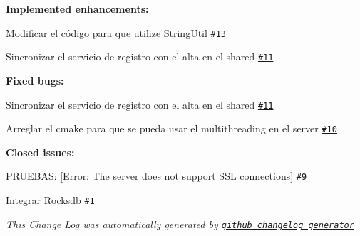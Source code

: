 {\bfseries Implemented enhancements\+:}


\begin{DoxyItemize}
\item Modificar el código para que utilize String\+Util \href{https://github.com/seguijoaquin/taller2-appserver/issues/13}{\tt \#13}
\item Sincronizar el servicio de registro con el alta en el shared \href{https://github.com/seguijoaquin/taller2-appserver/issues/11}{\tt \#11}
\end{DoxyItemize}

{\bfseries Fixed bugs\+:}


\begin{DoxyItemize}
\item Sincronizar el servicio de registro con el alta en el shared \href{https://github.com/seguijoaquin/taller2-appserver/issues/11}{\tt \#11}
\item Arreglar el cmake para que se pueda usar el multithreading en el server \href{https://github.com/seguijoaquin/taller2-appserver/issues/10}{\tt \#10}
\end{DoxyItemize}

{\bfseries Closed issues\+:}


\begin{DoxyItemize}
\item P\+R\+U\+E\+B\+AS\+: \mbox{[}Error\+: The server does not support S\+SL connections\mbox{]} \href{https://github.com/seguijoaquin/taller2-appserver/issues/9}{\tt \#9}
\item Integrar Rocksdb \href{https://github.com/seguijoaquin/taller2-appserver/issues/1}{\tt \#1}
\item {\itshape This Change Log was automatically generated by \href{https://github.com/skywinder/Github-Changelog-Generator}{\tt github\+\_\+changelog\+\_\+generator}} 
\end{DoxyItemize}